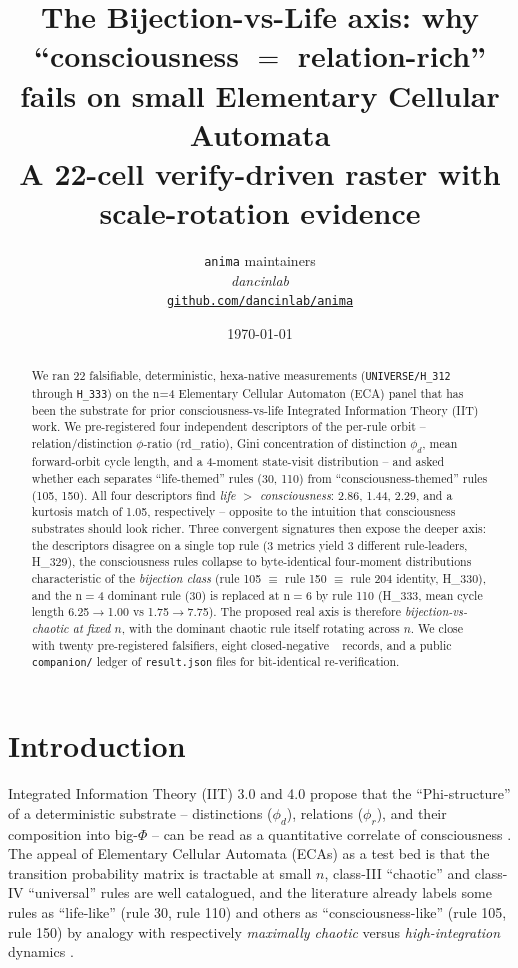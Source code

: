 \documentclass[11pt,a4paper]{article}
\title{
  \textbf{The Bijection-vs-Life axis: why ``consciousness $=$ relation-rich'' fails on small Elementary Cellular Automata}\\[4pt]
  \large A 22-cell verify-driven raster with scale-rotation evidence
}
\author{
  \texttt{anima} maintainers\\
  \normalsize\textit{dancinlab}\\[2pt]
  \normalsize\href{https://github.com/dancinlab/anima}{\texttt{github.com/dancinlab/anima}}
}
\date{\today}
\providecommand{\tierRed}{🔴}
\begin{document}
\maketitle

\begin{abstract}
We ran 22 falsifiable, deterministic, hexa-native measurements
(\texttt{UNIVERSE/H\_312} through \texttt{H\_333}) on the
n=4 Elementary Cellular Automaton (ECA) panel that has been the substrate
for prior consciousness-vs-life Integrated Information Theory (IIT) work.
We pre-registered four
independent descriptors of the per-rule orbit -- relation/distinction
$\phi$-ratio (rd\_ratio), Gini concentration of distinction $\phi_d$,
mean forward-orbit cycle length, and a 4-moment state-visit
distribution -- and asked whether each separates
``life-themed'' rules (\textsc{30}, \textsc{110}) from
``consciousness-themed'' rules (\textsc{105}, \textsc{150}).
All four descriptors find \emph{life $>$ consciousness}: 2.86, 1.44, 2.29,
and a kurtosis match of 1.05, respectively -- opposite to the
intuition that consciousness substrates should look richer.
Three convergent signatures then expose the deeper axis: the descriptors
disagree on a single top rule (3 metrics yield 3 different rule-leaders,
H\_329), the consciousness rules collapse to byte-identical four-moment
distributions characteristic of the \emph{bijection class}
(rule 105 $\equiv$ rule 150 $\equiv$ rule 204 identity, H\_330), and
the n$=$4 dominant rule (\textsc{30}) is replaced at n$=$6 by
rule \textsc{110} (H\_333, mean cycle length 6.25$\to$1.00 vs 1.75$\to$7.75).
The proposed real axis is therefore
\emph{bijection-vs-chaotic at fixed $n$}, with the dominant chaotic rule
itself rotating across $n$. We close with twenty pre-registered
falsifiers, eight closed-negative \tierRed\ records, and a public
\texttt{companion/} ledger of \texttt{result.json} files for bit-identical
re-verification.
\end{abstract}

\section{Introduction}
\label{sec:intro}

Integrated Information Theory (IIT) 3.0 and 4.0 propose that the
``Phi-structure'' of a deterministic substrate -- distinctions
($\phi_d$), relations ($\phi_r$), and their composition into big-$\Phi$
-- can be read as a quantitative correlate of consciousness
\citep{tononi2016iit,oizumi2014phenomenology,albantakis2023iit4}. The
appeal of Elementary Cellular Automata (ECAs)
\citep{wolfram1984universality,langton1990edgeofchaos} as a test bed is
that the transition probability matrix is tractable at small $n$,
class-III ``chaotic'' and class-IV ``universal'' rules are well
catalogued, and the literature already labels some rules as
``life-like'' (rule 30, rule 110) and others as
``consciousness-like'' (rule 105, rule 150) by analogy with
respectively
\emph{maximally chaotic} versus \emph{high-integration} dynamics
\citep{albantakis2015evolution}.
\end{document}
